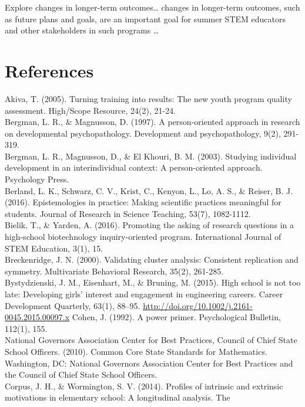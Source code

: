 \documentclass[]{msu-thesis}
\theoremstyle{definition}
\theoremstyle{definition}
\theoremstyle{definition}
\theoremstyle{remark}
\begin{document}
Explore changes in longer-term outcomes\ldots{} changes in longer-term
outcomes, such as future plans and goals, are an important goal for
summer STEM educators and other stakeholders in such programs \ldots{}

\newpage

\chapter{References}\label{references}

Akiva, T. (2005). Turning training into results: The new youth program
quality assessment. High/Scope Resource, 24(2), 21-24.\\
Bergman, L. R., \& Magnusson, D. (1997). A person-oriented approach in
research on developmental psychopathology. Development and
psychopathology, 9(2), 291-319.\\
Bergman, L. R., Magnusson, D., \& El Khouri, B. M. (2003). Studying
individual development in an interindividual context: A person-oriented
approach. Psychology Press.\\
Berland, L. K., Schwarz, C. V., Krist, C., Kenyon, L., Lo, A. S., \&
Reiser, B. J. (2016). Epistemologies in practice: Making scientific
practices meaningful for students. Journal of Research in Science
Teaching, 53(7), 1082-1112.\\
Bielik, T., \& Yarden, A. (2016). Promoting the asking of research
questions in a high-school biotechnology inquiry-oriented program.
International Journal of STEM Education, 3(1), 15.\\
Breckenridge, J. N. (2000). Validating cluster analysis: Consistent
replication and symmetry. Multivariate Behavioral Research, 35(2),
261-285.\\
Bystydzienski, J. M., Eisenhart, M., \& Bruning, M. (2015). High school
is not too late: Developing girls' interest and engagement in
engineering careers. Career Development Quarterly, 63(1), 88--95.
\url{http://doi.org/10.1002/j.2161-0045.2015.00097.x} Cohen, J. (1992).
A power primer. Psychological Bulletin, 112(1), 155.\\
National Governors Association Center for Best Practices, Council of
Chief State School Officers. (2010). Common Core State Standards for
Mathematics. Washington, DC: National Governors Association Center for
Best Practices and the Council of Chief State School Officers.\\
Corpus, J. H., \& Wormington, S. V. (2014). Profiles of intrinsic and
extrinsic motivations in elementary school: A longitudinal analysis. The
\end{document}

